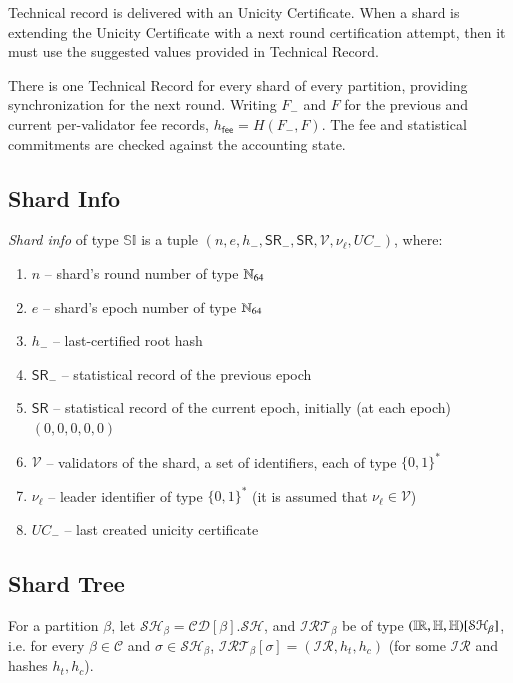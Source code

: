 Technical record is delivered with an Unicity Certificate. When a shard is extending the Unicity Certificate with a next round certification attempt, then it must use the suggested values provided in Technical Record.

There is one Technical Record for every shard of every partition, providing synchronization for the next round. Writing $F_-$ and $F$ for the previous and current per-validator fee records, $h_\mathsf{fee}=H(F_-,F)$. The fee and statistical commitments are checked against the accounting state.

\subsection{Shard Info}

\emph{Shard info} of type $\mathbb{SI}$ is a tuple $(n, e, h_-, \mathsf{SR}_-, \mathsf{SR}, \mathcal{V}, \nu_\ell, UC_-)$, where:
\begin{enumerate}
	\item $n$ -- shard's round number of type $\mathbb{N}_{64}$
	\item $e$ -- shard's epoch number of type $\mathbb{N}_{64}$
	\item $h_-$ -- last-certified root hash
	\item $\mathsf{SR}_-$ -- statistical record of the previous epoch
	\item $\mathsf{SR}$ -- statistical record of the current epoch, initially (at each epoch) $(0,0,0,0,0)$
	\item $\mathcal{V}$ -- validators of the shard, a set of identifiers, each of type $\{0,1\}^\ast$
	\item $\nu_\ell$ --  leader identifier of type $\{0,1\}^\ast$ (it is assumed that $\nu_\ell\in \mathcal{V}$)
	\item $UC_-$ -- last created unicity certificate
\end{enumerate}

\subsection{Shard Tree}\label{se:shard-tree}

For a partition $\beta$, let $\mathcal{SH}_\beta = \mathcal{CD}[\beta].\mathcal{SH}$, and
$\mathcal{IRT}_\beta$ be of type $(\mathbb{IR},\mathbb{H},\mathbb{H})[\mathcal{SH}_\beta]$, i.e. for
every $\beta\in\mathcal{C}$ and $\sigma\in\mathcal{SH}_\beta$, $\mathcal{IRT}_\beta[\sigma]=(\mathcal{IR},h_t,h_c)$ (for some $\mathcal{IR}$ and hashes $h_t,h_c$).

